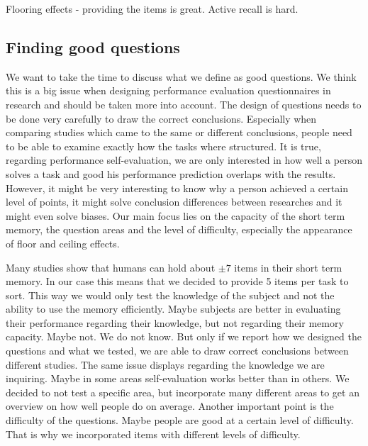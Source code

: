 \documentclass[../main/main.tex]{subfiles}
\begin{document}
	Flooring effects - providing the items is great. Active recall is hard.
	
	
	\subsection{Finding good questions}
	
	We want to take the time to discuss what we define as good questions. We think this is a big issue when designing performance evaluation questionnaires in research and should be taken more into account. The design of questions needs to be done very carefully to draw the correct conclusions. Especially when comparing studies which came to the same or different conclusions, people need to be able to examine exactly how the tasks where structured. It is true, regarding performance self-evaluation, we are only interested in how well a person solves a task and good his performance prediction overlaps with the results. However, it might be very interesting to know why a person achieved a certain level of points, it might solve conclusion differences between researches and it might even solve biases. Our main focus lies on the capacity of the short term memory, the question areas and the level of difficulty, especially the appearance of floor and ceiling effects.
	
	Many studies show that humans can hold about $\pm 7$ items in their short term memory. In our case this means that we decided to provide 5 items per task to sort. This way we would only test the knowledge of the subject and not the ability to use the memory efficiently. Maybe subjects are better in evaluating their performance regarding their knowledge, but not regarding their memory capacity. Maybe not. We do not know. But only if we report how we designed the questions and what we tested, we are able to draw correct conclusions between different studies. The same issue displays regarding the knowledge we are inquiring. Maybe in some areas self-evaluation works better than in others. We decided to not test a specific area, but incorporate many different areas to get an overview on how well people do on average. Another important point is the difficulty of the questions. Maybe people are good at a certain level of difficulty. That is why we incorporated items with different levels of difficulty.
	
\end{document}
